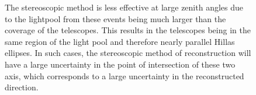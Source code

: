 \documentclass[main.tex]{subfiles}
\begin{document}
\begin{figure}[htbp]
  \centering
  \caption[Stereoscopic reconstruction at LZA.]{The stereoscopic method is less effective at large zenith angles due to the lightpool from these events being much larger than the coverage of the telescopes. This results in the telescopes being in the same region of the light pool and therefore nearly parallel Hillas ellipses. In such cases, the stereoscopic method of reconstruction will have a large uncertainty in the point of intersection of these two axis, which corresponds to a large uncertainty in the reconstructed direction.}
  \label{fig:LZA_lightpool}
\end{figure}
\end{document}
